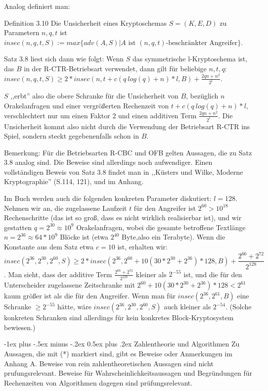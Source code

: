 \documentclass[a4paper]{article}
\makeatletter
\renewcommand{\section}{\@startsection{section}{1}{0mm}%
 {-1ex plus -.5ex minus -.2ex}%
 {0.5ex plus .2ex}%
 {\normalfont\large\bfseries}}
\makeatother
\begin{document}
\begin{multicols}{3}
    Analog definiert man:

    Definition 3.10 Die Unsicherheit eines Kryptoschemas $S=(K,E,D)$ zu Parametern $n,q,t$ ist $insec(n,q,t,S):=max\{adv(A,S)|A \text{ ist }(n,q,t)\text{-beschränkter Angreifer}\}$.

    Satz 3.8 liest sich dann wie folgt: Wenn $S$ das symmetrische l-Kryptoschema ist, das $B$ in der R-CTR-Betriebsart verwendet, dann gilt für beliebige $n,t,q$: $insec(n,q,t,S)\geq 2 * insec(n,t+c(q\ log(q) +n)*l,B) +\frac{2qn+n^2}{2^l}$.

    $S$ ,,erbt'' also die obere Schranke für die Unsicherheit von $B$, bezüglich $n$ Orakelanfragen und einer vergrößerten Rechenzeit von $t+c(q\ log(q) +n)*l$, verschlechtert nur um einen Faktor $2$ und einen additiven Term $\frac{2qn+n^2}{2^l}$. Die Unsicherheit kommt also nicht durch die Verwendung der Betriebsart R-CTR ins Spiel, sondern steckt gegebenenfalls schon in $B$.

    Bemerkung: Für die Betriebsarten R-CBC und OFB gelten Aussagen, die zu Satz 3.8 analog sind. Die Beweise sind allerdings noch aufwendiger. Einen vollständigen Beweis von Satz 3.8 findet man in ,,Küsters und Wilke, Moderne Kryptographie'' (S.114, 121), und im Anhang.

    Im Buch werden auch die folgenden konkreten Parameter diskutiert: $l=128$. Nehmen wir an, die zugelassene Laufzeit $t$ für den Angreifer ist $2^{60} > 10^{18}$ Rechenschritte (das ist so groß, dass es nicht wirklich realisierbar ist), und wir gestatten $q=2^{30} \approx 10^{9}$ Orakelanfragen, wobei die gesamte betroffene Textlänge $n=2^{36}\approx 64*10^9$ Blöcke ist (etwa $2^{40}$ Byte,also ein Terabyte). Wenn die Konstante aus dem Satz etwa $c=10$ ist, erhalten wir: $$insec(2^{36}, 2^{30}, 2^{60},S)\geq 2*insec(2^{36}, 2^{60}+ 10(30*2^{30}+ 2^{36})* 128 ,B) +\frac{2^{66} + 2^{72}}{2^{128}}$$.
    Man sieht, dass der additive Term $\frac{2^{66} +2^{72}}{2^{128}}$ kleiner als $2^{-55}$ ist, und die für den Unterscheider zugelassene Zeitschranke mit $2^{60} + 10(30* 2^{30}+2^{36})*128 < 2^{61}$ kaum größer ist als die für den Angreifer. Wenn man für $insec(2^{36}, 2^{61} ,B)$ eine Schranke $\geq 2^{-55}$ hätte, wäre $insec(2^{36}, 2^{30}, 2^{60},S)$ auch kleiner als $2^{-54}$. (Solche konkreten Schranken sind allerdings für kein konkretes Block-Kryptosystem bewiesen.)

    \section{Zahlentheorie und Algorithmen}
    Zu Aussagen, die mit (*) markiert sind, gibt es Beweise oder Anmerkungen im Anhang A. Beweise von rein zahlentheoretischen Aussagen sind nicht prufungsrelevant. Beweise für Wahrscheinlichkeitsaussagen und Begründungen für Rechenzeiten von Algorithmen dagegen sind prüfungsrelevant.


\end{multicols}
\end{document}

